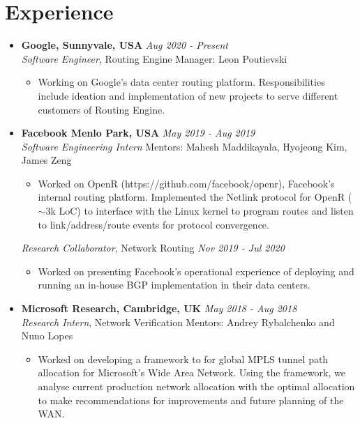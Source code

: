 \documentclass[11pt,a4paper,sans]{moderncv}        %
\begin{document}
\section{Experience}
\begin{itemize}
	\item \textbf{Google, Sunnyvale, USA} \hfill \emph{Aug 2020 - Present} \\
	\emph{Software Engineer}, Routing Engine \hfill Manager: Leon Poutievski
	\begin{itemize}
		\item Working on Google's data center routing platform. Responsibilities 
		include ideation and implementation of new projects to 
		serve different customers of Routing Engine. 
	\end{itemize}
	\vspace*{6pt}

	\item \textbf{Facebook Menlo Park, USA} \hfill \emph{May 2019 - Aug 2019} \\
	\emph{Software Engineering Intern} \hfill Mentors: Mahesh Maddikayala, Hyojeong Kim, James Zeng
	\begin{itemize}
		\item Worked on OpenR (https://github.com/facebook/openr), Facebook's internal routing platform. Implemented the
		Netlink protocol for OpenR ($\sim$3k LoC) to interface with the Linux kernel to program routes and listen to link/address/route events
		for protocol convergence.
	\end{itemize}
	\emph{Research Collaborator}, Network Routing \hfill \emph{Nov 2019 - Jul 2020} 
	\begin{itemize}
		\item Worked on presenting Facebook's operational experience of
		deploying and running an in-house BGP implementation in their data centers.
	\end{itemize}
	\vspace*{6pt}

	\item \textbf{Microsoft Research, Cambridge, UK} \hfill \emph{May 2018 - Aug 2018} \\
	\emph{Research Intern}, Network Verification \hfill Mentors: Andrey Rybalchenko and Nuno Lopes
	\begin{itemize}
		\item Worked on developing a framework to for global MPLS tunnel path allocation for Microsoft's
		Wide Area Network. Using the framework, we analyse current production network allocation with
		the optimal allocation to make recommendations for improvements and future planning of the WAN.
	\end{itemize}
	\vspace*{6pt}


\end{itemize}
\end{document}
